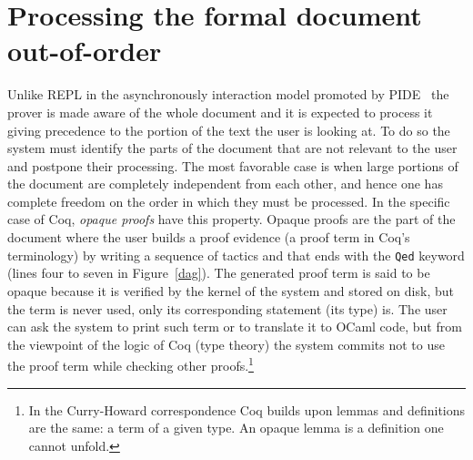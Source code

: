 \documentclass[runningheads,a4paper,oribibl]{llncs}
\newcommand{\tmverbatim}[1]{\lstinline|#1|}
\begin{document}
%

\section{Processing the formal document out-of-order}\label{document}

Unlike REPL in the asynchronously interaction model promoted by
PIDE~\cite{DBLP:journals/corr/Wenzel13} 
the prover is made aware of the whole document and it is expected to process
it giving precedence to the portion of the text the user is looking at. To do
so the system must identify the parts of the document that are not relevant to
the user and postpone their processing. The most favorable case is when large
portions of the document are completely independent from each other, and hence
one has complete freedom on the order in which they must be processed. In the specific
case of Coq, {\emph{opaque proofs}} have this property. Opaque proofs are the
part of the document where the user builds a proof evidence (a proof
term in
Coq's terminology) by writing a sequence of tactics and that ends with the
\tmverbatim{Qed} keyword (lines four to seven in Figure~\ref{dag}). The
generated proof term is said to be opaque because it is verified
by the kernel of the system and stored on disk, but the term is never
used, only its corresponding statement (its type) is. The user can ask the
system to print such term or to translate it to OCaml code, but from the
viewpoint of the logic of Coq (type theory) the system commits not to use the
proof term while checking other proofs.{\footnote{In the Curry-Howard
correspondence Coq builds upon lemmas and definitions are the same: a
term of a given type. An opaque lemma is a definition one cannot unfold.}}
\end{document}
